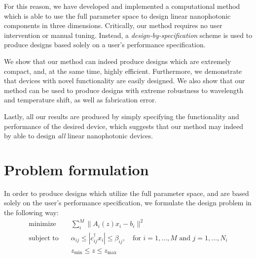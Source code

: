 \documentclass[letterpaper,10pt]{article}
\DeclareMathOperator*{\minimize}{\text{minimize}\quad}
\newcommand{\subto}{\text{subject to}\quad}
\newcommand{\T}{^\dagger}
\begin{document}
For this reason, we have developed and implemented a computational method
    which is able to use the full parameter space 
    to design linear nanophotonic components in three dimensions.
Critically, our method requires no user intervention or manual tuning.
Instead, a \emph{design-by-specification} scheme is used 
    to produce designs based solely on a user's performance specification.

We show that our method can indeed produce designs 
    which are extremely compact, and, at the same time, highly efficient.
Furthermore, we demonstrate that devices with novel functionality
    are easily designed.
We also show that our method can be used to produce designs
    with extreme robustness to wavelength and temperature shift,
    as well as fabrication error.

Lastly, all our results are produced by simply specifying
    the functionality and performance of the desired device,
    which suggests that our method may indeed by able
    to design \emph{all} linear nanophotonic devices.

\section{Problem formulation}
In order to produce designs which utilize the full parameter space,
    and are based solely on the user's performance specification,
    we formulate the design problem in the following way:
\begin{subequations}\begin{align}
    \minimize & \sum_i^M \|A_i(z)x_i - b_i\|^2 \\
    \subto & \alpha_{ij} \le |c_{ij}\T x_i| \le \beta_{ij}, \quad
        \text{for $i = 1, \ldots, M$ and $j = 1, \ldots, N_i$} \\
        &   z_\text{min} \le z \le z_\text{max}
\end{align} \label{problem}\end{subequations}
\end{document}
